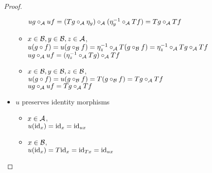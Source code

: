 \documentclass[12pt]{article}
\theoremstyle{plain}
\theoremstyle{definition}
\begin{document}
\begin{proof}
\begin{itemize}
\begin{itemize}
$ug \circ_{{\cal A}} uf = (Tg \circ_{{\cal A}} \eta_{y}) \circ_{{\cal A}} (\eta_{y}^{-1} \circ_{{\cal A}} Tf)= Tg \circ_{{\cal A}} Tf$
 \item $ x \in {\cal B}, y \in {\cal B}, z \in {\cal A}$, \\
$u(g \circ f) = u(g \circ_{{\cal B}} f) = \eta_{z}^{-1} \circ_{{\cal A}} T(g \circ_{{\cal B}} f) = \eta_{z}^{-1} \circ_{{\cal A}} Tg \circ_{{\cal A}} Tf$ \\
$ug \circ_{{\cal A}} uf = (\eta_{z}^{-1} \circ_{{\cal A}} Tg) \circ_{{\cal A}} Tf$
 \item $x \in {\cal B}, y \in {\cal B}, z \in {\cal B}$, \\
 $u(g \circ f) = u( g \circ_{{\cal B}} f ) = T(g \circ_{{\cal B}} f)=Tg \circ_{{\cal A}} Tf$ \\
$ug \circ_{{\cal A}} uf =Tg \circ_{{\cal A}} Tf$
 \end{itemize}
 
\item $u$ preserves identity morphisms
 \begin{itemize}
 \item $x \in {\cal A}$, \\
$u({\rm id}_{x})={\rm id}_{x}={\rm id}_{ux}$
 \item $x \in {\cal B}$, \\
$u({\rm id}_{x})=T{\rm id}_{x}={\rm id}_{Tx}={\rm id}_{ux}$
 \end{itemize}
 

\end{itemize}
\end{proof}
\end{document}
